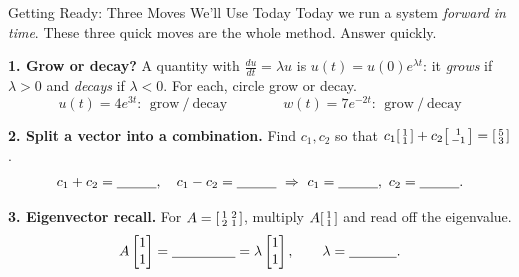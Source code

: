\documentclass[10pt]{article}
\begin{document}
\namedateperiod

\vspace{0.12in}

\begin{notesbox}{Getting Ready: Three Moves We'll Use Today}
\small Today we run a system \emph{forward in time}. These three quick moves are the whole method. Answer quickly.

\vspace{4pt}
\textbf{1. Grow or decay?} A quantity with $\frac{du}{dt}=\lambda u$ is $u(t)=u(0)e^{\lambda t}$: it \emph{grows}
if $\lambda>0$ and \emph{decays} if $\lambda<0$. For each, circle grow or decay.
\[
  u(t)=4e^{3t}:\ \ \text{grow}\ /\ \text{decay} \qquad\qquad
  w(t)=7e^{-2t}:\ \ \text{grow}\ /\ \text{decay}
\]

\vspace{4pt}
\textbf{2. Split a vector into a combination.} Find $c_1,c_2$ so that
$c_1\begin{bsmallmatrix}1\\1\end{bsmallmatrix}+c_2\begin{bsmallmatrix}1\\-1\end{bsmallmatrix}=\begin{bsmallmatrix}5\\3\end{bsmallmatrix}$.
\[
  c_1+c_2=\blank{1.0cm},\quad c_1-c_2=\blank{1.0cm}\ \Rightarrow\ c_1=\blank{1.0cm},\ c_2=\blank{1.0cm}.
\]

\vspace{4pt}
\textbf{3. Eigenvector recall.} For $A=\begin{bsmallmatrix}1&2\\2&1\end{bsmallmatrix}$, multiply
$A\begin{bsmallmatrix}1\\1\end{bsmallmatrix}$ and read off the eigenvalue.
\[
  A\begin{bmatrix}1\\1\end{bmatrix}=\blank{1.6cm}=\lambda\begin{bmatrix}1\\1\end{bmatrix},
  \qquad \lambda=\blank{1.2cm}.
\]
\end{notesbox}
\end{document}
